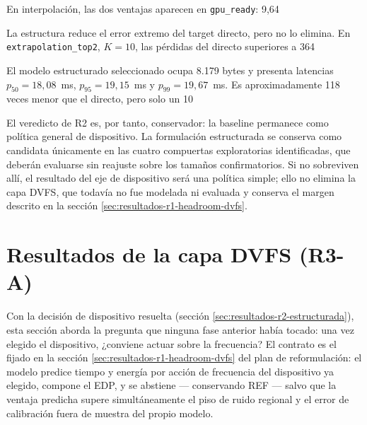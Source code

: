 \documentclass[12pt,oneside,spanish]{book}
\begin{document}
En interpolación, las dos ventajas aparecen en \texttt{gpu\_ready}: 9,64\,%

La estructura reduce el error extremo del target directo, pero no lo elimina. En \texttt{extrapolation\_top2}, $K=10$, las pérdidas del directo superiores a 364\,%

El modelo estructurado seleccionado ocupa 8.179 bytes y presenta latencias $p_{50}=18,08$~ms, $p_{95}=19,15$~ms y $p_{99}=19,67$~ms. Es aproximadamente 118 veces menor que el directo, pero solo un 10\,%

El veredicto de R2 es, por tanto, conservador: la baseline permanece como política general de dispositivo. La formulación estructurada se conserva como candidata únicamente en las cuatro compuertas exploratorias identificadas, que deberán evaluarse sin reajuste sobre los tamaños confirmatorios. Si no sobreviven allí, el resultado del eje de dispositivo será una política simple; ello no elimina la capa DVFS, que todavía no fue modelada ni evaluada y conserva el margen descrito en la sección \ref{sec:resultados-r1-headroom-dvfs}.


\section{Resultados de la capa DVFS (R3-A)}
\label{sec:resultados-r3-dvfs}

Con la decisión de dispositivo resuelta (sección \ref{sec:resultados-r2-estructurada}), esta sección aborda la pregunta que ninguna fase anterior había tocado: una vez elegido el dispositivo, ¿conviene actuar sobre la frecuencia? El contrato es el fijado en la sección \ref{sec:resultados-r1-headroom-dvfs} del plan de reformulación: el modelo predice tiempo y energía por acción de frecuencia del dispositivo ya elegido, compone el EDP, y se abstiene --- conservando REF --- salvo que la ventaja predicha supere simultáneamente el piso de ruido regional y el error de calibración fuera de muestra del propio modelo.
\end{document}

